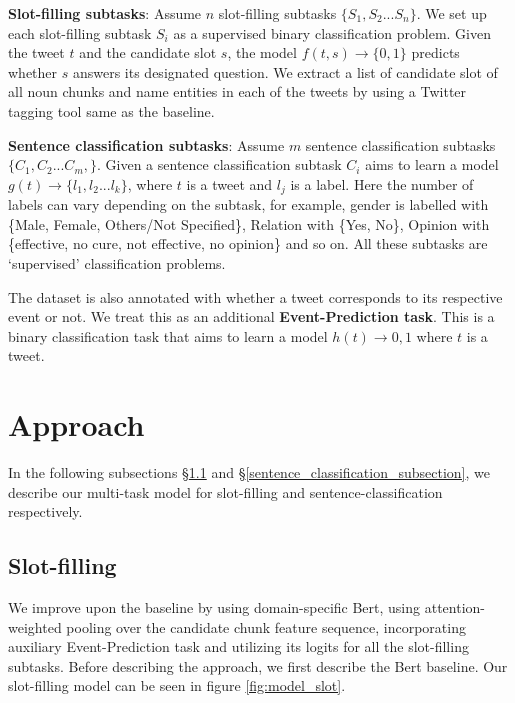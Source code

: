 \documentclass[11pt,a4paper]{article}
\begin{document}
\textbf{Slot-filling subtasks}: Assume $n$ slot-filling subtasks $\{S_1, S_2 ... S_n\}$. We set up each slot-filling subtask $S_i$ as a supervised binary classification problem. Given the tweet $t$ and the candidate slot $s$, the model $f(t, s) \to \{0, 1\}$ predicts whether $s$ answers its designated question. We extract a list of candidate slot of all noun chunks and name entities in each of the tweets by using a Twitter tagging tool \cite{ritteretal-2011named} same as the baseline.

\textbf{Sentence classification subtasks}: Assume $m$ sentence classification subtasks $\{C_1, C_2 ... C_m,\}$. Given a sentence classification subtask $C_i$ aims to learn a model $g(t) \to \{l_1, l_2 ... l_{k}\}$, where $t$ is a tweet and $l_j$ is a label. Here the number of labels can vary depending on the subtask, for example, gender is labelled with \{Male, Female, Others/Not Specified\}, Relation with \{Yes, No\}, Opinion with \{effective, no cure, not effective, no opinion\} and so on. All these subtasks are `supervised' classification problems.

The dataset is also annotated with whether a tweet corresponds to its respective event or not. We treat this as an additional \textbf{Event-Prediction task}. This is a binary classification task that aims to learn a model $h(t) \to {0, 1}$ where $t$ is a tweet.










\section{Approach}\label{approach_section}



In the following subsections \S \ref{slot_filling_subsection} and \S \ref{sentence_classification_subsection}, we describe our multi-task model for slot-filling and sentence-classification respectively.

\subsection{Slot-filling} \label{slot_filling_subsection}
We improve upon the baseline \cite{zong2020extracting} by using domain-specific Bert, using attention-weighted pooling over the candidate chunk feature sequence, incorporating auxiliary Event-Prediction task and utilizing its logits for all the slot-filling subtasks. Before describing the approach, we first describe the Bert baseline. Our slot-filling model can be seen in figure \ref{fig:model_slot}.
\end{document}
